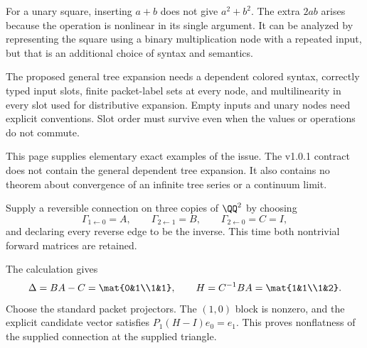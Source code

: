 
For a unary square, inserting $a+b$ does not give $a^2+b^2$. The extra $2ab$ arises because the operation is nonlinear in its single argument. It can be analyzed by representing the square using a binary multiplication node with a repeated input, but that is an additional choice of syntax and semantics.

The proposed general tree expansion needs a dependent colored syntax, correctly typed input slots, finite packet-label sets at every node, and multilinearity in every slot used for distributive expansion. Empty inputs and unary nodes need explicit conventions. Slot order must survive even when the values or operations do not commute.

This page supplies elementary exact examples of the issue. The v1.0.1 contract does not contain the general dependent tree expansion. It also contains no theorem about convergence of an infinite tree series or a continuum limit.


Supply a reversible connection on three copies of $\QQ^2$ by choosing
\[
\Gamma_{1\leftarrow0}=A,\qquad\Gamma_{2\leftarrow1}=B,
\qquad\Gamma_{2\leftarrow0}=C=I,
\]
and declaring every reverse edge to be the inverse. This time both nontrivial forward matrices are retained.


The calculation gives
\[
\Delta=BA-C=\mat{0&1\\1&1},\qquad H=C^{-1}BA=\mat{1&1\\1&2}.
\]
Choose the standard packet projectors. The $(1,0)$ block is nonzero, and the explicit candidate vector satisfies $P_1(H-I)e_0=e_1$. This proves nonflatness of the supplied connection at the supplied triangle.

